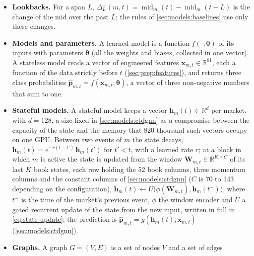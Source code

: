 \begin{itemize}[nosep]
  read, its state is the one of its last event, and a prediction for it would repeat the
  previous one.  Nothing is required of the market between $t$ and $t + H$, except that
  it is still trading at $t + H$: the label reads the last mid before $t + H$, whatever
  happened in between (\cref{sec:data:labels}).  A day has
  about ten million samples.  When the market and the time are not needed, a sample is
  written $(\mathbf{x}_i, y_i)$, $i = 1, \ldots, N$.
  \item \textbf{Lookbacks.}  For a span $L$,
  $\Delta^{-}_{L}(m, t) = \operatorname{mid}_m(t) - \operatorname{mid}_m(t - L)$ is the
  change of the mid over the past $L$; the rules of \cref{sec:models:baselines} use only
  these changes.
  \item \textbf{Models and parameters.}  A learned model is a function $f(\cdot;
  \boldsymbol{\theta})$ of its inputs with parameters $\boldsymbol{\theta}$ (all the
  weights and biases, collected in one vector).  A stateless model reads a vector of
  engineered features $\mathbf{x}_{m,t} \in \mathbb{R}^{61}$, each a function of the data
  strictly before $t$ (\cref{sec:prep:features}), and returns three class probabilities
  $\hat{\mathbf{p}}_{m,t} = f(\mathbf{x}_{m,t}; \boldsymbol{\theta})$, a vector of three
  non-negative numbers that sum to one.
  \item \textbf{Stateful models.}  A stateful model keeps a vector
  $\mathbf{h}_m(t) \in \mathbb{R}^{d}$ per market, with $d = 128$, a size fixed in
  \cref{sec:models:ctdgnn} as a compromise between the capacity of the state and the memory
  that 820 thousand such vectors occupy on one GPU.  Between two events of
  $m$ the state decays, $\mathbf{h}_m(t) = e^{-r (t - t')}\, \mathbf{h}_m(t')$ for
  $t' < t$, with a learned rate $r$; at a block in which $m$ is active the state is
  updated from the window $\mathbf{W}_{m,t} \in \mathbb{R}^{K \times C}$ of its last $K$
  book states, each row holding the $52$ book columns, three momentum columns and the
  constant columns of \cref{sec:models:ctdgnn} ($C$ is 70 to 143 depending on the
  configuration), $\mathbf{h}_m(t) \leftarrow U\bigl(\phi(\mathbf{W}_{m,t}),
  \mathbf{h}_m(t^{-})\bigr)$, where $t^{-}$ is the time of the market's previous event, $\phi$
  the window encoder and $U$ a gated recurrent update of the state from the new input,
  written in full in \cref{eq:state-update}; the prediction is
  $\hat{\mathbf{p}}_{m,t} = g(\mathbf{h}_m(t), \mathbf{x}_{m,t})$
  (\cref{sec:models:ctdgnn}).
  \item \textbf{Graphs.}  A graph $G = (V, E)$ is a set of nodes $V$ and a set of edges

\end{itemize}
